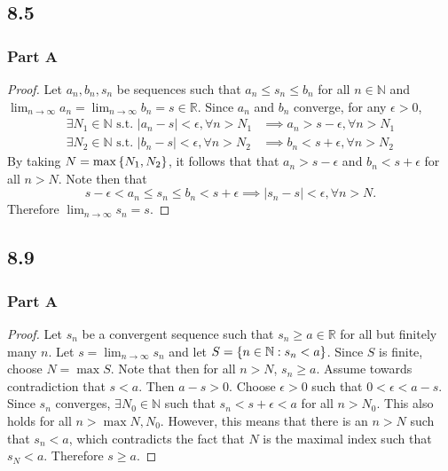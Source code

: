 \documentclass[12pt,titlepage]{extarticle}
\begin{document}
\subsection*{8.5}
\subsubsection*{Part A}
\begin{proof}
    Let $a_n, b_n, s_n$ be sequences such that $a_n \leq s_n \leq b_n$ for all $n \in \mathbb{N}$ and $\lim_{n \to \infty} a_n = \lim_{n \to \infty} b_n = s \in \mathbb{R}$. Since $a_n$ and $b_n$ converge, for any $\epsilon > 0$,
    \begin{align*}
        \exists N_1 \in \mathbb{N} \text{ s.t. } |a_n - s| < \epsilon, \forall n > N_1 &\implies a_n > s - \epsilon, \forall n > N_1 \\
        \exists N_2 \in \mathbb{N} \text{ s.t. } |b_n - s| < \epsilon, \forall n > N_2 &\implies b_n < s + \epsilon, \forall n > N_2
    \end{align*}
    By taking $N = \max\qty{N_1, N_2}$, it follows that  that $a_n > s - \epsilon$ and $b_n < s + \epsilon$ for all $n > N$. Note then that
    \[
        s - \epsilon < a_n \leq s_n \leq b_n < s + \epsilon \implies |s_n - s| < \epsilon, \forall n > N.
    \]
    Therefore $\lim_{n\to \infty} s_n = s$.
\end{proof}

\subsection*{8.9}
\subsubsection*{Part A}
\begin{proof}
    Let $s_n$ be a convergent sequence such that $s_n \geq a \in \mathbb{R}$ for all but finitely many $n$. Let $s = \lim_{n \to \infty} s_n$ and let $S = \qty{n \in \mathbb{N} : s_n < a}$. Since $S$ is finite, choose $N = \max S$. Note that then for all $n > N$, $s_n \geq a$. Assume towards contradiction that $s < a$. Then $a - s > 0$. Choose $\epsilon > 0$ such that $0 < \epsilon < a - s$. Since $s_n$ converges, $\exists N_0 \in \mathbb{N}$ such that $s_n < s + \epsilon < a$ for all $n > N_0$. This also holds for all $n > \max{N, N_0}$. However, this means that there is an $n > N$ such that $s_n < a$, which contradicts the fact that $N$ is the maximal index such that $s_N < a$. Therefore $s \geq a$.
\end{proof}
\end{document}
